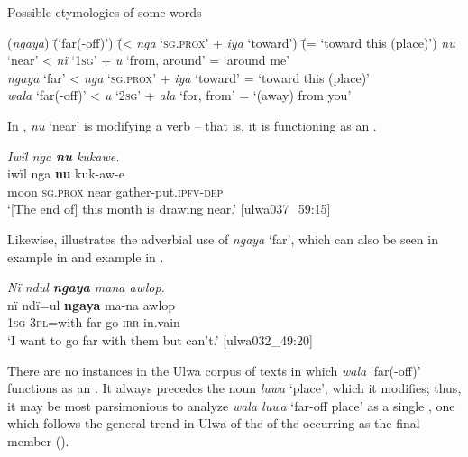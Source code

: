 \ea%
    \label{ex:otherwc:96}
          Possible etymologies of some  words\\
\begin{tabbing}
{(\textit{ngaya})} \= {(‘far(-off)’)} \= {(< \textit{nga} ‘\textsc{sg.prox}’ + \textit{iya} ‘toward’)} \= {(= ‘toward this (place)’)}\kill
{\textit{nu}} \> {‘near’} \> {< \textit{nï} ‘1\textsc{sg}’ + \textit{u} ‘from, around’} \> {= ‘around me’}\\
{\textit{ngaya}} \> {‘far’} \> {< \textit{nga} ‘\textsc{sg.prox}’ + \textit{iya} ‘toward’} \> {= ‘toward this (place)’}\\
{\textit{wala}} \> {‘far(-off)’} \> {< \textit{u} ‘2\textsc{sg}’ + \textit{ala} ‘for, from’} \> {= ‘(away) from you’}
\end{tabbing}
\z

In , \textit{nu} ‘near’ is modifying a verb -- that is, it is functioning as an .

\ea%
    \label{ex:otherwc:97}
          \textit{Iwïl nga \textbf{nu} kukawe.}\\
\gll iwïl  nga      \textbf{nu}    kuk-aw-e\\
    moon  \textsc{sg.prox}  near  gather-put.\textsc{ipfv-dep}\\
\glt `[The end of] this month is drawing near.’ [ulwa037\_59:15]
\z

Likewise,  illustrates the adverbial use of \textit{ngaya} ‘far’, which can also be seen in example  in  and example  in .

\ea%
    \label{ex:otherwc:98}
          \textit{Nï ndul \textbf{ngaya} mana awlop.}\\
\gll    nï    ndï=ul    \textbf{ngaya}  ma-na  awlop\\
    1\textsc{sg}  3\textsc{pl}=with  far    go-\textsc{irr}  in.vain\\
\glt `I want to go far with them but can’t.’ [ulwa032\_49:20]
\z

There are no instances in the Ulwa corpus of texts in which \textit{wala} ‘far(-off)’ functions as an . It always precedes the noun \textit{luwa} ‘place’, which it modifies; thus, it may be most parsimonious to analyze \textit{wala luwa} ‘far-off place’ as a single , one which follows the general trend in Ulwa of the  of the  occurring as the final member ().

